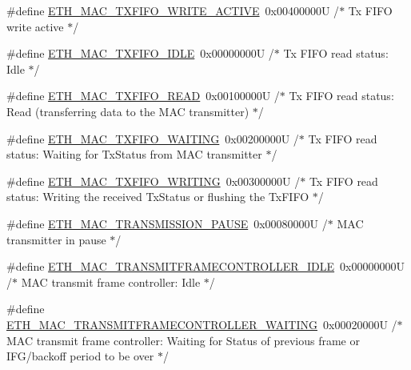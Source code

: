 \begin{DoxyCompactItemize}
\item 
\#define \hyperlink{group___h_a_l___e_t_h___aliased___defines_gaff6cebd747512114367fa01ef36e0394}{E\+T\+H\+\_\+\+M\+A\+C\+\_\+\+T\+X\+F\+I\+F\+O\+\_\+\+W\+R\+I\+T\+E\+\_\+\+A\+C\+T\+I\+VE}~0x00400000\+U  /$\ast$ Tx F\+I\+F\+O write active $\ast$/
\item 
\#define \hyperlink{group___h_a_l___e_t_h___aliased___defines_ga36e9938d6f099aab9f801d547d0a88a5}{E\+T\+H\+\_\+\+M\+A\+C\+\_\+\+T\+X\+F\+I\+F\+O\+\_\+\+I\+D\+LE}~0x00000000\+U  /$\ast$ Tx F\+I\+F\+O read status\+: Idle $\ast$/
\item 
\#define \hyperlink{group___h_a_l___e_t_h___aliased___defines_ga162f3eb163f0fc63e0ef21f640ee3b35}{E\+T\+H\+\_\+\+M\+A\+C\+\_\+\+T\+X\+F\+I\+F\+O\+\_\+\+R\+E\+AD}~0x00100000\+U  /$\ast$ Tx F\+I\+F\+O read status\+: Read (transferring data to the M\+A\+C transmitter) $\ast$/
\item 
\#define \hyperlink{group___h_a_l___e_t_h___aliased___defines_ga732d203562136a49e6fdfe08cbbdb007}{E\+T\+H\+\_\+\+M\+A\+C\+\_\+\+T\+X\+F\+I\+F\+O\+\_\+\+W\+A\+I\+T\+I\+NG}~0x00200000\+U  /$\ast$ Tx F\+I\+F\+O read status\+: Waiting for Tx\+Status from M\+A\+C transmitter $\ast$/
\item 
\#define \hyperlink{group___h_a_l___e_t_h___aliased___defines_gaa98e266d20386f08f1e7d07924ae7fd8}{E\+T\+H\+\_\+\+M\+A\+C\+\_\+\+T\+X\+F\+I\+F\+O\+\_\+\+W\+R\+I\+T\+I\+NG}~0x00300000\+U  /$\ast$ Tx F\+I\+F\+O read status\+: Writing the received Tx\+Status or flushing the Tx\+F\+I\+F\+O $\ast$/
\item 
\#define \hyperlink{group___h_a_l___e_t_h___aliased___defines_ga858c30b0c902a609fbf5e9de54c873fc}{E\+T\+H\+\_\+\+M\+A\+C\+\_\+\+T\+R\+A\+N\+S\+M\+I\+S\+S\+I\+O\+N\+\_\+\+P\+A\+U\+SE}~0x00080000\+U  /$\ast$ M\+A\+C transmitter in pause $\ast$/
\item 
\#define \hyperlink{group___h_a_l___e_t_h___aliased___defines_ga3b6682322869b2f8ff8a34239418b229}{E\+T\+H\+\_\+\+M\+A\+C\+\_\+\+T\+R\+A\+N\+S\+M\+I\+T\+F\+R\+A\+M\+E\+C\+O\+N\+T\+R\+O\+L\+L\+E\+R\+\_\+\+I\+D\+LE}~0x00000000\+U  /$\ast$ M\+A\+C transmit frame controller\+: Idle $\ast$/
\item 
\#define \hyperlink{group___h_a_l___e_t_h___aliased___defines_ga51af5af4f0244add557e29f1c1085c76}{E\+T\+H\+\_\+\+M\+A\+C\+\_\+\+T\+R\+A\+N\+S\+M\+I\+T\+F\+R\+A\+M\+E\+C\+O\+N\+T\+R\+O\+L\+L\+E\+R\+\_\+\+W\+A\+I\+T\+I\+NG}~0x00020000\+U  /$\ast$ M\+A\+C transmit frame controller\+: Waiting for Status of previous frame or I\+F\+G/backoff period to be over $\ast$/
\item 

\end{DoxyCompactItemize}
